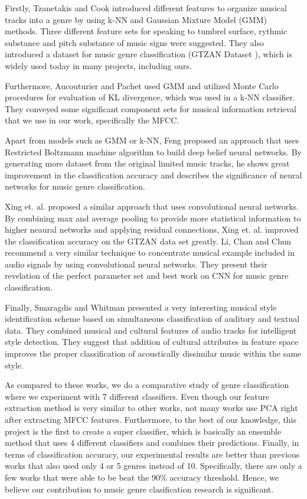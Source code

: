 Firstly, Tzanetakis and Cook \cite{GTZAN:2002} introduced different features to organize musical tracks into a genre by using k-NN and Gaussian Mixture Model (GMM) methods. Three different feature sets for speaking to tumbrel surface, rythmic substance and pitch substance of music signs were suggested. They also introduced a dataset for music genre classification (GTZAN Dataset \cite{GTZAN:2002}), which is widely used today in many projects, including ours. 

Furthermore, Aucouturier and Pachet \cite{Pachet:2003} used GMM and utilized Monte Carlo procedures for evaluation of KL divergence, which was used in a k-NN classifier. They conveyed some significant component sets for musical information retrieval that we use in our work, specifically the MFCC. 

Apart from models such as GMM or k-NN, Feng \cite{Feng:2016} proposed an approach that uses Restricted Boltzmann machine algorithm to build deep belief neural networks. By generating more dataset from the original limited music tracks, he shows great improvement in the classification accuracy and describes the significance of neural networks for music genre classification. 

Xing et. al. \cite{Xing:2016} proposed a similar approach that uses convolutional neural networks. By combining max and average pooling to provide more statistical information to higher neaural networks and applying residual connections, Xing et. al. \cite{Xing:2016} improved the classification accuracy on the GTZAN data set greatly. Li, Chan and Chun \cite{Chun:2010} recommend a very similar technique to concentrate musical example included in audio signals by using convolutional neural networks. They present their revelation of the perfect parameter set and best work on CNN for music genre classification.

Finally, Smaragdis and Whitman \cite{Smaragdis:2002} presented a very interesting musical style identification scheme based on simultaneous classification of auditory and textual data. They combined musical and cultural features of audio tracks for intelligent style detection. They suggest that addition of cultural attributes in feature space improves the proper classification of acoustically dissimilar music within the same style.

As compared to these works, we do a comparative study of genre classification where we experiment with 7 different classifiers. Even though our feature extraction method is very similar to other works, not many works use PCA right after extracting MFCC features. Furthermore, to the best of our knowledge, this project is the first to create a super classifier, which is basically an ensemble method that uses 4 different classifiers and combines their predictions. Finally, in terms of classification accuracy, our experimental results are better than previous works that also used only 4 or 5 genres instead of 10. Specifically, there are only a few works that were able to be beat the 90\% accuracy threshold. Hence, we believe our contribution to music genre clasification research is significant.  

